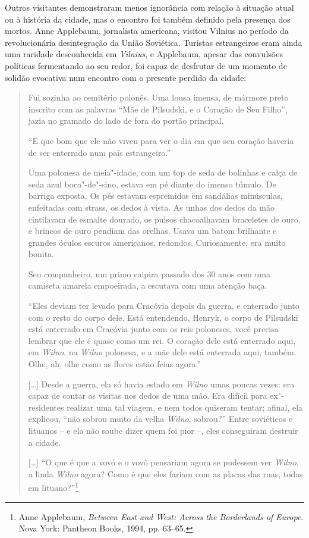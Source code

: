 Outros visitantes demonstraram menos ignorância com relação à situação
atual ou à história da cidade, mas o encontro foi também definido pela
presença dos mortos. Anne Applebaum, jornalista americana, visitou
Vilnius no período da revolucionária desintegração da União Soviética.
Turistas estrangeiros eram ainda uma raridade desconhecida em \textit{Vilnius}, e
Applebaum, apesar das convulsões políticas fermentando ao seu redor, foi
capaz de desfrutar de um momento de solidão evocativa num encontro com o
presente perdido da cidade:

\begin{quote}
Fui sozinha ao cemitério polonês. Uma lousa imensa, de mármore preto
inscrito com as palavras ``Mãe de Pilsudski, e o Coração de Seu Filho'',
jazia no gramado do lado de fora do portão principal.

``E que bom que ele não viveu para ver o dia em que seu coração haveria
de ser enterrado num país estrangeiro.''

Uma polonesa de meia"-idade, com um top de seda de bolinhas e calça de
seda azul boca"-de"-sino, estava em pé diante do imenso túmulo. De barriga
exposta. Os pés estavam espremidos em sandálias minúsculas, enfeitadas
com strass, os dedos à vista. As unhas dos dedos da mão cintilavam de
esmalte dourado, os pulsos chacoalhavam braceletes de ouro, e brincos de
ouro pendiam das orelhas. Usava um batom brilhante e grandes óculos
escuros americanos, redondos. Curiosamente, era muito bonita.

Seu companheiro, um primo caipira passado dos 30 anos com uma
camiseta amarela empoeirada, a escutava com uma atenção baça.

``Eles deviam ter levado para Cracóvia depois da guerra, e enterrado
junto com o resto do corpo dele. Está entendendo, Henryk, o corpo de
Pilsudski está enterrado em Cracóvia junto com os reis poloneses, você
precisa lembrar que ele é quase como um rei. O coração dele está
enterrado aqui, em \textit{Wilno}, na \textit{Wilno} polonesa, e a mãe dele está enterrada
aqui, também. Olhe, ah, olhe como as flores estão feias agora.''

[\ldots{}] Desde a guerra, ela só havia estado em \textit{Wilno} umas poucas vezes:
era capaz de contar as visitas nos dedos de uma mão. Era difícil para
ex"-residentes realizar uma tal viagem, e nem todos quiseram tentar;
afinal, ela explicou, ``não sobrou muito da velha \textit{Wilno}, sobrou?'' Entre
soviéticos e lituanos -- e ela não soube dizer quem foi pior --, eles
conseguiram destruir a cidade.

[\ldots{}] ``O que é que a vovó e o vovô pensariam agora se pudessem ver
\textit{Wilno}, a linda \textit{Wilno} agora? Como é que eles fariam com as placas das
ruas, todas em lituano?''\footnote{Anne Applebaum, \textit{Between East and West: Across the Borderlands of Europe}. Nova York: Pantheon Books, 1994, pp. 63--65.}
\end{quote}

